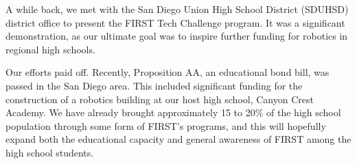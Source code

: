 A while back, we met with the San Diego Union High School District (SDUHSD) district office to present the FIRST Tech Challenge program. It was a significant demonstration, as our ultimate goal was to inspire further funding for robotics in regional high schools.

Our efforts paid off. Recently, Proposition AA, an educational bond bill, was passed in the San Diego area. This included significant funding for the construction of a robotics building at our host high school, Canyon Crest Academy. We have already brought approximately 15 to 20\% of the high school population through some form of FIRST's programs, and this will hopefully expand both the educational capacity and general awareness of FIRST among the high school students.